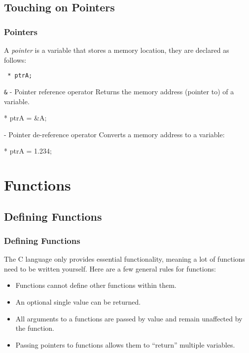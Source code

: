 \documentclass[smaller,table]{beamer} %
\begin{document}
\subsection{Touching on Pointers}
\begin{frame}[fragile]
\frametitle{Pointers}
A \emph{pointer} is a variable that stores a memory location, they are declared as follows:
\begin{center}
\tt {} * ptrA;
\end{center}

\begin{block}{{\tt \&} - Pointer reference operator}
Returns the memory address (pointer to) of a variable.
\begin{semiverbatim}
    * ptrA = \&A;   
\end{semiverbatim}
\end{block}

\begin{block}{{\tt *} - Pointer de-reference operator}
Converts a memory address to a variable:
\begin{semiverbatim}
   * ptrA  = 1.234;      
\end{semiverbatim}
\end{block}
\end{frame}



\section{Functions}

\subsection{Defining Functions}
\begin{frame}
\frametitle{Defining Functions}
The C language only provides essential functionality, meaning a lot of functions need to be written yourself. Here are a few general rules for functions:

\begin{itemize}
\item Functions cannot define other functions within them.
\item An optional single value can be returned.
\item All arguments to a functions are passed by value and remain unaffected by the function.
\item Passing pointers to functions allows them to ``return'' multiple variables.
\end{itemize}
\end{frame}
\end{document}
